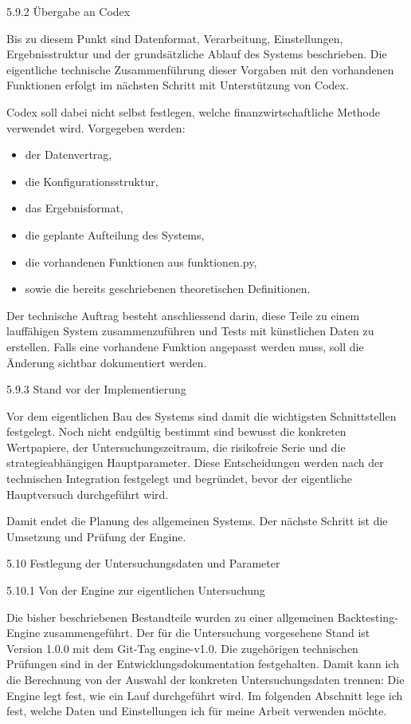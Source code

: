 \documentclass[
  ngerman,
  a4paper,
  DIV=11,
  oneside]{scrreprt}
\providecommand{\tightlist}{%
  \setlength{\itemsep}{0pt}\setlength{\parskip}{0pt}}
\begin{document}
5.9.2 Übergabe an Codex

Bis zu diesem Punkt sind Datenformat, Verarbeitung, Einstellungen,
Ergebnisstruktur und der grundsätzliche Ablauf des Systems beschrieben.
Die eigentliche technische Zusammenführung dieser Vorgaben mit den
vorhandenen Funktionen erfolgt im nächsten Schritt mit Unterstützung von
Codex.

Codex soll dabei nicht selbst festlegen, welche finanzwirtschaftliche
Methode verwendet wird. Vorgegeben werden:

\begin{itemize}
\tightlist
\item
  der Datenvertrag,
\item
  die Konfigurationsstruktur,
\item
  das Ergebnisformat,
\item
  die geplante Aufteilung des Systems,
\item
  die vorhandenen Funktionen aus funktionen.py,
\item
  sowie die bereits geschriebenen theoretischen Definitionen.
\end{itemize}

Der technische Auftrag besteht anschliessend darin, diese Teile zu einem
lauffähigen System zusammenzuführen und Tests mit künstlichen Daten zu
erstellen. Falls eine vorhandene Funktion angepasst werden muss, soll
die Änderung sichtbar dokumentiert werden.

5.9.3 Stand vor der Implementierung

Vor dem eigentlichen Bau des Systems sind damit die wichtigsten
Schnittstellen festgelegt. Noch nicht endgültig bestimmt sind bewusst
die konkreten Wertpapiere, der Untersuchungszeitraum, die risikofreie
Serie und die strategieabhängigen Hauptparameter. Diese Entscheidungen
werden nach der technischen Integration festgelegt und begründet, bevor
der eigentliche Hauptversuch durchgeführt wird.

Damit endet die Planung des allgemeinen Systems. Der nächste Schritt ist
die Umsetzung und Prüfung der Engine.

5.10 Festlegung der Untersuchungsdaten und Parameter

5.10.1 Von der Engine zur eigentlichen Untersuchung

Die bisher beschriebenen Bestandteile wurden zu einer allgemeinen
Backtesting-Engine zusammengeführt. Der für die Untersuchung vorgesehene
Stand ist Version 1.0.0 mit dem Git-Tag engine-v1.0. Die zugehörigen
technischen Prüfungen sind in der Entwicklungsdokumentation
festgehalten. Damit kann ich die Berechnung von der Auswahl der
konkreten Untersuchungsdaten trennen: Die Engine legt fest, wie ein Lauf
durchgeführt wird. Im folgenden Abschnitt lege ich fest, welche Daten
und Einstellungen ich für meine Arbeit verwenden möchte.
\end{document}
